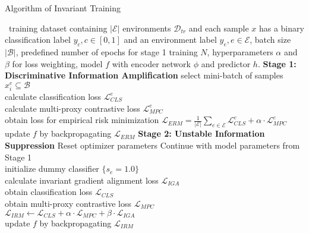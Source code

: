 \begin{algorithm}[htb]
\caption{Algorithm of Invariant Training}
\label{alg1}
    \begin{algorithmic}[1]
    \REQUIRE ~training dataset containing $|\mathcal{E}|$ environments $\mathcal{D}_{tr}$ and each sample $x$ has a binary classification label $y_{c}, c \in [0, 1]$ and an environment label $y_e, e \in \mathcal{E}$, batch size $|\mathcal{B}|$, predefined number of epochs for stage 1 training $N$, hyperparameters $\alpha$ and $\beta$ for loss weighting, model $f$ with encoder network $\phi$ and predictor $h$. 
    \ENSURE 
    \STATE \textbf{Stage 1: Discriminative Information Amplification}
            \STATE select mini-batch of samples ${x_i^{e}} \subseteq \mathcal{B}$ \\
            \STATE calculate classification loss $\mathcal{L}^{e}_{CLS}$\\
            \STATE calculate multi-proxy contrastive loss $\mathcal{L}^{e}_{MPC}$ \\
            \ENDFOR
        \STATE obtain loss for empirical risk minimization $\mathcal{L}_{ERM} = \frac{1}{|\mathcal{E}|} \sum_{e \in \mathcal{E}} \mathcal{L}^{e}_{CLS} + \alpha \cdot \mathcal{L}^{e}_{MPC}$
        \STATE update $f$ by backpropagating $\mathcal{L}_{ERM}$
        \ENDFOR
    \ENDFOR
    \STATE \textbf{Stage 2: Unstable Information Suppression}
    \STATE Reset optimizer parameters
    \STATE Continue with model parameters from Stage 1\\
            \STATE initialize dummy classifier $\{s_{e} = 1.0\}$ \\
            \ENDFOR
            \STATE calculate invariant gradient alignment loss $\mathcal{L}_{IGA}$ \\
            \STATE obtain classification loss $\mathcal{L}_{CLS}$ \\
            \STATE obtain multi-proxy contrastive loss $\mathcal{L}_{MPC}$ \\
            \STATE $\mathcal{L}_{IRM} \gets \mathcal{L}_{CLS} + \alpha \cdot \mathcal{L}_{MPC} + \beta \cdot \mathcal{L}_{IGA}$ \\
            \STATE update $f$ by backpropagating $\mathcal{L}_{IRM}$
        \ENDFOR
    \ENDFOR
    \end{algorithmic}
\end{algorithm}